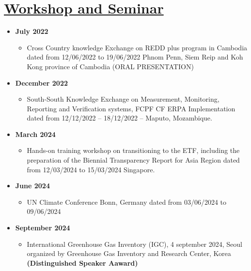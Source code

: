 \documentclass[
]{article}
\providecommand{\tightlist}{%
  \setlength{\itemsep}{0pt}\setlength{\parskip}{0pt}}
\begin{document}
\section{\texorpdfstring{\underline{Workshop and Seminar}}{}}\label{section-4}

\begin{itemize}
\tightlist
\item
  \textbf{July 2022}

  \begin{itemize}
  \tightlist
  \item
    Cross Country knowledge Exchange on REDD plus program in Cambodia
    dated from 12/06/2022 to 19/06/2022 Phnom Penn, Siem Reip and Koh
    Kong province of Cambodia (ORAL PRESENTATION)
  \end{itemize}
\item
  \textbf{December 2022}

  \begin{itemize}
  \tightlist
  \item
    South-South Knowledge Exchange on Measurement, Monitoring, Reporting
    and Verification systems, FCPF CF ERPA Implementation dated from
    12/12/2022 -- 18/12/2022 -- Maputo, Mozambique.
  \end{itemize}
\item
  \textbf{March 2024}

  \begin{itemize}
  \tightlist
  \item
    Hands-on training workshop on transitioning to the ETF, including
    the preparation of the Biennial Transparency Report for Asia Region
    dated from 12/03/2024 to 15/03/2024 Singapore.
  \end{itemize}
\item
  \textbf{June 2024}

  \begin{itemize}
  \tightlist
  \item
    UN Climate Conference Bonn, Germany dated from 03/06/2024 to
    09/06/2024
  \end{itemize}
\item
  \textbf{September 2024}

  \begin{itemize}
  \tightlist
  \item
    International Greenhouse Gas Inventory (IGC), 4 september 2024,
    Seoul organized by Greenhouse Gas Inventory and Research Center,
    Korea \textbf{(Distinguished Speaker Aaward)}
  \end{itemize}
\end{itemize}
\end{document}
